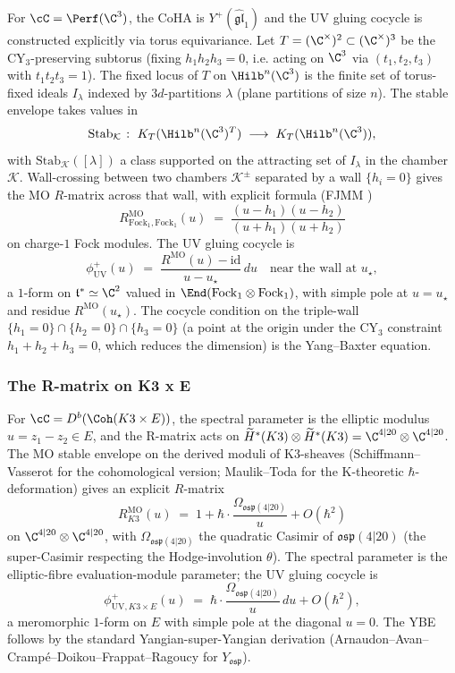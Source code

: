For $\cC = \Perf(\C^3)$, the CoHA is $Y^+(\widehat{\mathfrak{gl}}_1)$
and the UV gluing cocycle is constructed explicitly via torus
equivariance.  Let $T = (\C^\times)^2 \subset (\C^\times)^3$ be the
CY$_3$-preserving subtorus (fixing $h_1 h_2 h_3 = 0$, i.e. acting on
$\C^3$ via $(t_1, t_2, t_3)$ with $t_1 t_2 t_3 = 1$).  The fixed
locus of $T$ on $\Hilb^n(\C^3)$ is the finite set of
torus-fixed ideals $I_\lambda$ indexed by $3d$-partitions $\lambda$
(plane partitions of size $n$).  The stable envelope takes values in
\[
 \mathrm{Stab}_{\mathcal{K}} \;\colon\;
 K_T(\Hilb^n(\C^3)^T) \;\longrightarrow\; K_T(\Hilb^n(\C^3)),
\]
with $\mathrm{Stab}_{\mathcal{K}}([\lambda])$ a class supported on
the attracting set of $I_\lambda$ in the chamber $\mathcal{K}$.
Wall-crossing between two chambers
$\mathcal{K}^\pm$ separated by a wall $\{h_i = 0\}$ gives the
MO $R$-matrix across that wall, with explicit formula (FJMM
\cite{FJMM2017})
\[
 R^{\mathrm{MO}}_{\mathrm{Fock}_1, \mathrm{Fock}_1}(u) \;=\;
 \frac{(u - h_1)(u - h_2)}{(u + h_1)(u + h_2)}
\]
on charge-$1$ Fock modules.  The UV gluing cocycle is
\[
 \phi^+_{\mathrm{UV}}(u) \;=\;
 \frac{R^{\mathrm{MO}}(u) - \mathrm{id}}{u - u_\star} \, du
 \quad\text{near the wall at } u_\star,
\]
a $1$-form on $\mathfrak{t}^* \simeq \C^2$ valued in $\End(
\mathrm{Fock}_1 \otimes \mathrm{Fock}_1)$, with simple pole at
$u = u_\star$ and residue $R^{\mathrm{MO}}(u_\star)$.  The cocycle
condition on the triple-wall $\{h_1 = 0\} \cap \{h_2 = 0\} \cap \{h_3
= 0\}$ (a point at the origin under the CY$_3$ constraint $h_1 + h_2
+ h_3 = 0$, which reduces the dimension) is the Yang--Baxter equation.

\subsubsection*{The R-matrix on K3 x E}

For $\cC = D^b(\Coh(K3 \times E))$, the spectral parameter is the
elliptic modulus $u = z_1 - z_2 \in E$, and the R-matrix acts on
$\widetilde H^*(K3) \otimes \widetilde H^*(K3) = \C^{4|20} \otimes
\C^{4|20}$.  The MO stable envelope on the derived moduli of
K3-sheaves (Schiffmann--Vasserot \cite{SV2017} for the cohomological
version; Maulik--Toda for the K-theoretic $\hbar$-deformation) gives
an explicit $R$-matrix
\[
 R^{\mathrm{MO}}_{K3}(u) \;=\;
 1 + \hbar \cdot \frac{\Omega_{\mathfrak{osp}(4|20)}}{u} +
 O(\hbar^2)
\]
on $\C^{4|20} \otimes \C^{4|20}$, with $\Omega_{\mathfrak{osp}(4|20)}$
the quadratic Casimir of $\mathfrak{osp}(4|20)$ (the super-Casimir
respecting the Hodge-involution $\theta$).  The spectral parameter
is the elliptic-fibre evaluation-module parameter; the UV gluing
cocycle is
\[
 \phi^+_{\mathrm{UV}, K3 \times E}(u)
 \;=\; \hbar \cdot \frac{\Omega_{\mathfrak{osp}(4|20)}}{u} \, du +
 O(\hbar^2),
\]
a meromorphic $1$-form on $E$ with simple pole at the diagonal
$u = 0$.  The YBE follows by the standard Yangian-super-Yangian
derivation (Arnaudon--Avan--Cramp\'e--Doikou--Frappat--Ragoucy
\cite{AvanFrappat} for $Y_{\mathfrak{osp}}$).

